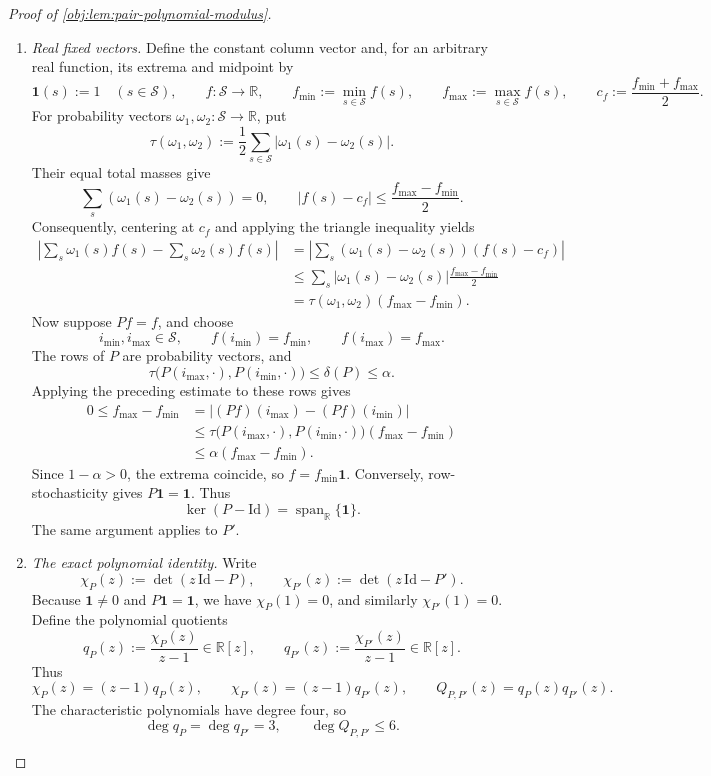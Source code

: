 \documentclass[11pt]{article}
\begin{document}
\begin{proof}[Proof of \cref{obj:lem:pair-polynomial-modulus}]
\begin{enumerate}
\item \emph{Real fixed vectors.}\label{proof:pair-polynomial-modulus:fixed-vectors}
Define the constant column vector and, for an arbitrary real function, its extrema and midpoint by
\[
\mathbf1(s):=1\quad(s\in\mathcal S),\qquad
f:\mathcal S\to\mathbb R,\qquad
f_{\min}:=\min_{s\in\mathcal S}f(s),\qquad
f_{\max}:=\max_{s\in\mathcal S}f(s),\qquad
c_f:=\frac{f_{\min}+f_{\max}}2.
\]
For probability vectors \(\omega_1,\omega_2:\mathcal S\to\mathbb R\), put
\[
\tau(\omega_1,\omega_2)
:=\frac12\sum_{s\in\mathcal S}|\omega_1(s)-\omega_2(s)|.
\]
Their equal total masses give
\[
\sum_s(\omega_1(s)-\omega_2(s))=0,
\qquad
|f(s)-c_f|\le\frac{f_{\max}-f_{\min}}2.
\]
Consequently, centering at \(c_f\) and applying the triangle inequality yields
\[
\begin{aligned}
\left|\sum_s\omega_1(s)f(s)-\sum_s\omega_2(s)f(s)\right|
&=\left|\sum_s(\omega_1(s)-\omega_2(s))(f(s)-c_f)\right|\\
&\le\sum_s|\omega_1(s)-\omega_2(s)|
                 \frac{f_{\max}-f_{\min}}2\\
&=\tau(\omega_1,\omega_2)(f_{\max}-f_{\min}).
\end{aligned}
\]
Now suppose \(Pf=f\), and choose
\[
i_{\min},i_{\max}\in\mathcal S,\qquad
f(i_{\min})=f_{\min},\qquad f(i_{\max})=f_{\max}.
\]
The rows of \(P\) are probability vectors, and
\[
\tau\bigl(P(i_{\max},\cdot),P(i_{\min},\cdot)\bigr)
\le\delta(P)\le\alpha.
\]
Applying the preceding estimate to these rows gives
\[
\begin{aligned}
0\le f_{\max}-f_{\min}
&=\left|(Pf)(i_{\max})-(Pf)(i_{\min})\right|\\
&\le
\tau\bigl(P(i_{\max},\cdot),P(i_{\min},\cdot)\bigr)
       (f_{\max}-f_{\min})\\
&\le\alpha(f_{\max}-f_{\min}).
\end{aligned}
\]
Since \(1-\alpha>0\), the extrema coincide, so \(f=f_{\min}\mathbf1\).
Conversely, row-stochasticity gives \(P\mathbf1=\mathbf1\). Thus
\[
\ker(P-\mathrm{Id})=\operatorname{span}_{\mathbb R}\{\mathbf1\}.
\]
The same argument applies to \(P'\).

\item \emph{The exact polynomial identity.}\label{proof:pair-polynomial-modulus:identity}
Write
\[
\chi_P(z):=\det(z\,\mathrm{Id}-P),\qquad
\chi_{P'}(z):=\det(z\,\mathrm{Id}-P').
\]
Because \(\mathbf1\ne0\) and \(P\mathbf1=\mathbf1\), we have
\(\chi_P(1)=0\), and similarly \(\chi_{P'}(1)=0\).
Define the polynomial quotients
\[
q_P(z):=\frac{\chi_P(z)}{z-1}\in\mathbb R[z],
\qquad
q_{P'}(z):=\frac{\chi_{P'}(z)}{z-1}\in\mathbb R[z].
\]
Thus
\[
\chi_P(z)=(z-1)q_P(z),\qquad
\chi_{P'}(z)=(z-1)q_{P'}(z),\qquad
Q_{P,P'}(z)=q_P(z)q_{P'}(z).
\]
The characteristic polynomials have degree four, so
\[
\deg q_P=\deg q_{P'}=3,\qquad \deg Q_{P,P'}\le6.
\]


\end{enumerate}
\end{proof}
\end{document}
